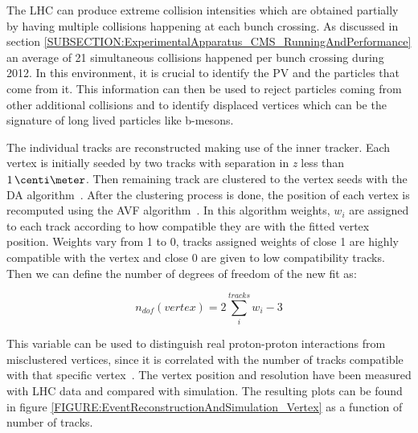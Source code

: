 
The \gls{LHC} can produce extreme collision intensities which are obtained partially by having multiple collisions happening at each bunch crossing. As discussed in section \ref{SUBSECTION:ExperimentalApparatus_CMS_RunningAndPerformance} an average of 21 simultaneous collisions happened per bunch crossing during 2012. In this environment, it is crucial to identify the \gls{PV} and the particles that come from it. This information can then be used to reject particles coming from other additional collisions and to identify displaced vertices which can be the signature of long lived particles like b-mesons.

The individual tracks are reconstructed making use of the inner tracker. Each vertex is initially seeded by two tracks with separation in \textit{z} less than $1\,\centi\meter$. Then remaining track are clustered to the vertex seeds with the \gls{DA} algorithm~\cite{ARTICLE:DeterministicAnnealing}. After the clustering process is done, the position of each vertex is recomputed using the \gls{AVF} algorithm~\cite{ARTICLE:AdaptiveVertexFitting}. In this algorithm weights, $w_{i}$ are assigned to each track according to how compatible they are with the fitted vertex position. Weights vary from 1 to 0, tracks assigned weights of close 1 are highly compatible with the vertex and close 0 are given to low compatibility tracks. Then we can define the number of degrees of freedom of the new fit as:

\begin{equation}
n_{dof}(vertex)=2\sum\limits_{i}^{tracks} w_i - 3
\end{equation}

This variable can be used to distinguish real proton-proton interactions from misclustered vertices, since it is correlated with the number of tracks compatible with that specific vertex~\cite{ARTICLE:CMSTrackingAndPrimaryVertex}. The vertex position and resolution have been measured with \gls{LHC} data and compared with simulation. The resulting plots can be found in figure \ref{FIGURE:EventReconstructionAndSimulation_Vertex} as a function of number of tracks.

